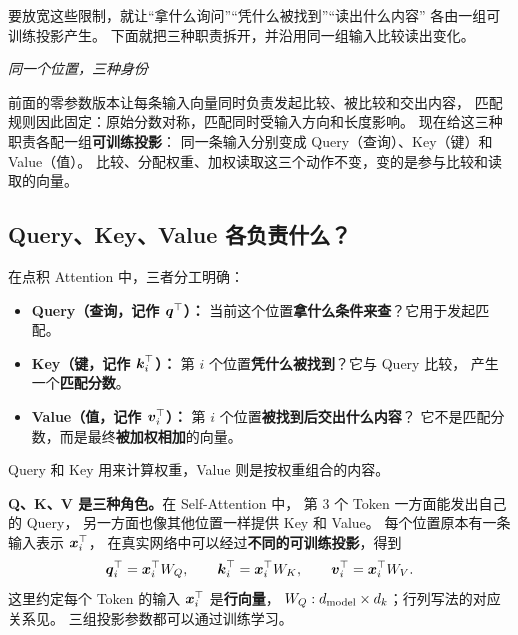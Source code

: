 要放宽这些限制，就让“拿什么询问”“凭什么被找到”“读出什么内容”
各由一组可训练投影产生。
下面就把三种职责拆开，并沿用同一组输入比较读出变化。



\begin{idea}
\noindent\emph{同一个位置，三种身份}\par

前面的零参数版本让每条输入向量同时负责发起比较、被比较和交出内容，
匹配规则因此固定：原始分数对称，匹配同时受输入方向和长度影响。
现在给这三种职责各配一组\textbf{可训练投影}：
同一条输入分别变成 Query（查询）、Key（键）和 Value（值）。
比较、分配权重、加权读取这三个动作不变，变的是参与比较和读取的向量。
\end{idea}

\subsection{Query、Key、Value 各负责什么？}
\label{concept:qkv}

在点积 Attention 中，三者分工明确：
\begin{itemize}
\item \textbf{Query（查询，记作 $\boldsymbol{q}^\top$）：}
当前这个位置\textbf{拿什么条件来查}？它用于发起匹配。
\item \textbf{Key（键，记作 $\boldsymbol{k}_i^\top$）：}
第 $i$ 个位置\textbf{凭什么被找到}？它与 Query 比较，
产生一个\textbf{匹配分数}。
\item \textbf{Value（值，记作 $\boldsymbol{v}_i^\top$）：}
第 $i$ 个位置\textbf{被找到后交出什么内容}？
它不是匹配分数，而是最终\textbf{被加权相加}的向量。
\end{itemize}

\begin{center}\QKVlegend\end{center}
Query 和 Key 用来计算权重，Value 则是按权重组合的内容。



\textbf{Q、K、V 是三种角色。}在 Self-Attention 中，
第 3 个 Token 一方面能发出自己的 Query，
另一方面也像其他位置一样提供 Key 和 Value。
每个位置原本有一条输入表示 $\boldsymbol{x}_i^\top$，
在真实网络中可以经过\textbf{不同的可训练投影}，得到
\[
\boldsymbol{q}_i^\top=\boldsymbol{x}_i^\top W_Q,\qquad
\boldsymbol{k}_i^\top=\boldsymbol{x}_i^\top W_K,\qquad
\boldsymbol{v}_i^\top=\boldsymbol{x}_i^\top W_V.
\]
这里约定每个 Token 的输入 $\boldsymbol{x}_i^\top$ 是\textbf{行向量}，
$W_Q:d_{\rm model}\times d_k$；行列写法的对应关系见。
三组投影参数都可以通过训练学习。

